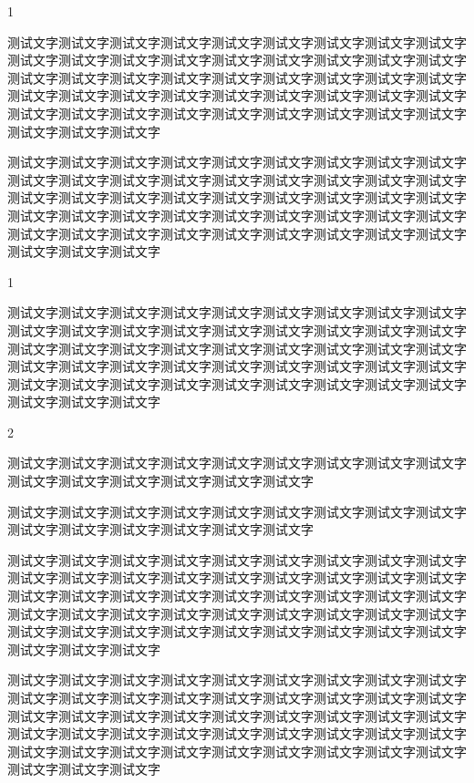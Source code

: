\begin{Project}
\begin{QuestionItem}[2]{1}
	\item 测试文字测试文字测试文字测试文字测试文字测试文字测试文字测试文字测试文字测试文字测试文字测试文字测试文字测试文字测试文字测试文字测试文字测试文字测试文字测试文字测试文字测试文字测试文字测试文字测试文字测试文字测试文字测试文字测试文字测试文字测试文字测试文字测试文字测试文字测试文字测试文字测试文字测试文字测试文字测试文字测试文字测试文字测试文字测试文字测试文字测试文字测试文字测试文字
	\item 测试文字测试文字测试文字测试文字测试文字测试文字测试文字测试文字测试文字测试文字测试文字测试文字测试文字测试文字测试文字测试文字测试文字测试文字测试文字测试文字测试文字测试文字测试文字测试文字测试文字测试文字测试文字测试文字测试文字测试文字测试文字测试文字测试文字测试文字测试文字测试文字测试文字测试文字测试文字测试文字测试文字测试文字测试文字测试文字测试文字测试文字测试文字测试文字
\end{QuestionItem}


\Thinking[副标题]
	\begin{QuestionItem}{1}
		\item 测试文字测试文字测试文字测试文字测试文字测试文字测试文字测试文字测试文字测试文字测试文字测试文字测试文字测试文字测试文字测试文字测试文字测试文字测试文字测试文字测试文字测试文字测试文字测试文字测试文字测试文字测试文字测试文字测试文字测试文字测试文字测试文字测试文字测试文字测试文字测试文字测试文字测试文字测试文字测试文字测试文字测试文字测试文字测试文字测试文字测试文字测试文字测试文字
			\begin{QuestionItem}{2}
				\item 测试文字测试文字测试文字测试文字测试文字测试文字测试文字测试文字测试文字测试文字测试文字测试文字测试文字测试文字测试文字
				\item 测试文字测试文字测试文字测试文字测试文字测试文字测试文字测试文字测试文字测试文字测试文字测试文字测试文字测试文字测试文字
			\end{QuestionItem}
		\item 测试文字测试文字测试文字测试文字测试文字测试文字测试文字测试文字测试文字测试文字测试文字测试文字测试文字测试文字测试文字测试文字测试文字测试文字测试文字测试文字测试文字测试文字测试文字测试文字测试文字测试文字测试文字测试文字测试文字测试文字测试文字测试文字测试文字测试文字测试文字测试文字测试文字测试文字测试文字测试文字测试文字测试文字测试文字测试文字测试文字测试文字测试文字测试文字
	\end{QuestionItem}
	
测试文字测试文字测试文字测试文字测试文字测试文字测试文字测试文字测试文字测试文字测试文字测试文字测试文字测试文字测试文字测试文字测试文字测试文字测试文字测试文字测试文字测试文字测试文字测试文字测试文字测试文字测试文字测试文字测试文字测试文字测试文字测试文字测试文字测试文字测试文字测试文字测试文字测试文字测试文字测试文字测试文字测试文字测试文字测试文字测试文字测试文字测试文字测试文字




\end{Project}
